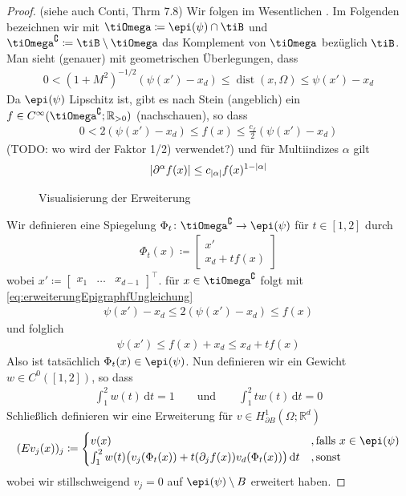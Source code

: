 \documentclass{scrartcl}
\def\R{\mathbb{R}}
\newcommand{\dif}[1]{\,\mathrm{d} #1}
\DeclareMathOperator{\dist}{dist}			%
\DeclarePairedDelimiter{\abs}{|}{|}
\newcommand{\vect}[1]{\begin{bmatrix} #1 \end{bmatrix}}
\begin{document}
\begin{proof}
	(siehe auch Conti, Thrm 7.8) Wir folgen im Wesentlichen \cite{Nit-1981}. Im Folgenden bezeichnen wir mit $\tiOmega\coloneqq\epi(\psi)\cap\tiB$ und $\tiOmega^\complement\coloneqq \tiB\setminus\tiOmega$ das Komplement von $\tiOmega$ bezüglich $\tiB$.
	 Man sieht  (genauer) mit geometrischen Überlegungen, dass
	\begin{align*}
		0<(1+M^2)^{-1/2}(\psi(x')-x_d)\leq \dist(x,\Omega)\leq \psi(x')-x_d
	\end{align*}
	Da $\epi(\psi)$ Lipschitz ist, gibt es nach Stein (angeblich) ein $f\in C^\infty(\tiOmega^\complement;\R_{>0})$ (nachschauen), so dass
	\begin{align}
		0 < 2(\psi(x')-x_d)\leq f(x)\leq \frac{c_f}{2}(\psi(x')-x_d) \label{eq:erweiterungEpigraphfUngleichung}
	\end{align}
	(TODO: wo wird der Faktor 1/2) verwendet?) und für Multiindizes $\alpha$ gilt
	\begin{align*}
		\abs{\partial^\alpha f(x)}\leq c_{\abs{\alpha}} f(x)^{1-\abs{\alpha}}
	\end{align*}
	
	\begin{figure}[h]
	\centering
	
	\caption{Visualisierung der Erweiterung}
	\end{figure}
	
	Wir definieren eine Spiegelung $\Phi_t\colon\tiOmega^\complement\to\epi(\psi)$ für $t\in[1,2]$ durch
	\begin{align*}
		\Phi_t(x)\coloneqq\vect{x'\\x_d+tf(x)}
	\end{align*}
	wobei $x'\coloneqq\vect{x_1&\dots& x_{d-1}}^\top$. 
	für $x\in\tiOmega^\complement$ folgt mit \eqref{eq:erweiterungEpigraphfUngleichung} 
	\begin{align*}
		 \psi(x')-x_d\leq 2(\psi(x')-x_d)\leq f(x)
	\end{align*}
	und folglich
	\begin{align*}
		\psi(x')\leq f(x)+x_d\leq x_d+tf(x)
	\end{align*}
	Also ist tatsächlich $\Phi_t(x)\in\epi(\psi)$.
	Nun definieren wir ein Gewicht $w\in C^0([1,2])$, so dass
	\begin{align*}
		\int_1^2w(t)\dif t = 1
		\qquad\text{und}\qquad\int_1^2tw(t)\dif t = 0
	\end{align*}
	Schließlich definieren wir eine Erweiterung für $v\in H^1_{\partial B}(\Omega;\R^d)$
	\begin{align*}
		(Ev_j(x))_j\coloneqq\begin{cases}
			v(x) &,\text{falls }x\in\epi(\psi)\\
			\int_1^2w(t)\big(v_j(\Phi_t(x))+t(\partial_jf(x))v_d(\Phi_t(x))\big)\dif t &,\text{sonst}
		\end{cases}
	\end{align*}
	wobei wir stillschweigend $v_j=0$ auf $\epi(\psi)\setminus B$ erweitert haben.
	

\end{proof}
\end{document}
